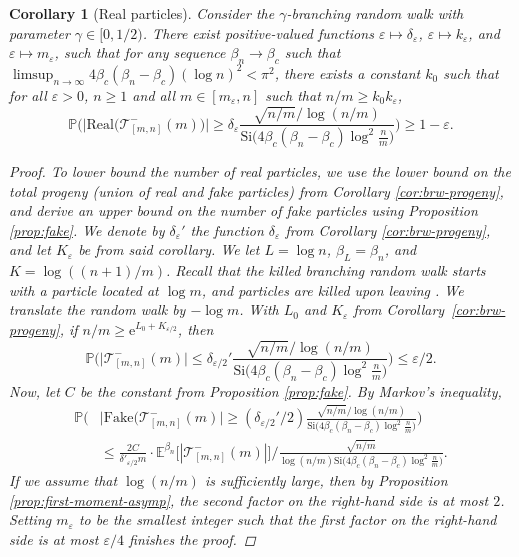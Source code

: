 \documentclass[a4paper, a4wide, 10pt, reqno]{amsart}
\theoremstyle{plain}
\newtheorem{corollary}[theorem]{Corollary}
\theoremstyle{definition}
\numberwithin{equation}{section}
\newcommand{\E}{\mathbb E}
\newcommand{\Prob}{\mathbb{P}}
\newcommand\eps{\varepsilon}
\newcommand{\sT}{{\mathscr T}}
\newcommand{\re}{{\mathrm e}}
\newcommand{\Si}{{\mathrm{Si}}}
\begin{document}
\begin{corollary}[Real particles]\label{cor:real}
    Consider the $\gamma$-branching random walk with parameter $\gamma\in[0, 1/2)$. There exist positive-valued functions $\varepsilon\mapsto \delta_\varepsilon$, $\varepsilon\mapsto k_\varepsilon$, and $\varepsilon\mapsto m_\varepsilon$, such that for any sequence $\beta_n \to\beta_c$ such that $\limsup_{n\to\infty}4\beta_c(\beta_n-\beta_c)(\log n)^2<\pi^2$, there exists a constant $k_0$ such that for all $\eps>0$, $n\ge 1$ and all $m\in[m_\eps, n]$ such that $n/m\ge k_0k_\eps$, 
    \[
    \Prob\bigg(\big|\mathrm{Real}\big(\sT^-_{[m,n]}(m)\big)\big|\ge \delta_\varepsilon \frac{\sqrt{n/m}\big/\log(n/m)}{\Si\big(4\beta_c(\beta_n-\beta_c)\log^2\frac{n}{m}\big)}\bigg) \ge 1-\varepsilon.
    \]
    \begin{proof}
    To lower bound the number of real particles, we use the lower bound on the total progeny (union of real and fake particles) from Corollary \ref{cor:brw-progeny}, and derive an upper bound on the number of fake particles using Proposition \ref{prop:fake}.
    We denote by $\delta_\varepsilon'$ the function $\delta_\varepsilon$ from Corollary \ref{cor:brw-progeny}, and let $K_\varepsilon$ be from said corollary. We let $L=\log n$, $\beta_L=\beta_n$, and $K=\log((n+1)/m)$. 
    Recall that the killed branching random walk \smash{$\sT^-_{[m,n]}(m)$} starts with a particle located at $\log m$, and particles are killed upon leaving \smash{$I_{[m,n]}^-=[\log m, \log(n+1))$}. We translate the random walk by $-\log m$. With $L_0$ and $K_{\varepsilon}$ from Corollary~\ref{cor:brw-progeny}, if $n/m\ge \re^{L_0+K_{\varepsilon/2}}$, then    
    \[
    \Prob\bigg(\big|\sT^-_{[m,n]}(m)\big|\le \delta_{\varepsilon/2}' \frac{\sqrt{n/m}\big/\log(n/m)}{\Si\big(4\beta_c(\beta_n-\beta_c)\log^2\frac{n}{m}\big)}\bigg)\le \varepsilon/2.
    \]
    Now, let $C$ be the constant from Proposition \ref{prop:fake}. By Markov's inequality,
    \begin{equation*}
    \begin{aligned}
        \Prob\bigg(&\big|\mathrm{Fake}\big(\sT^-_{[m,n]}(m)\big|\ge (\delta_{\varepsilon/2}'/2) \frac{\sqrt{n/m}\big/\log(n/m)}{\Si\big(4\beta_c(\beta_n-\beta_c)\log^2\frac{n}{m}\big)}\bigg) \\
        &\le \frac{2C}{\delta'_{\varepsilon/2}m}\cdot\E^{\beta_n}\Big[|\sT_{[m,n]}^-(m)|\Big]\Big/\frac{\sqrt{n/m}}{\log(n/m)\Si\big(4\beta_c(\beta_n-\beta_c)\log^2\frac{n}{m}\big)}.
        \end{aligned}
    \end{equation*}
    If we assume that $\log(n/m)$ is sufficiently large, then by Proposition \ref{prop:first-moment-asymp}, the second factor on the right-hand side is at most $2$. Setting $m_\varepsilon$ to be the smallest integer such that the first factor on the right-hand side is at most $\varepsilon/4$ finishes the proof. 
    \end{proof}
\end{corollary}
\end{document}
